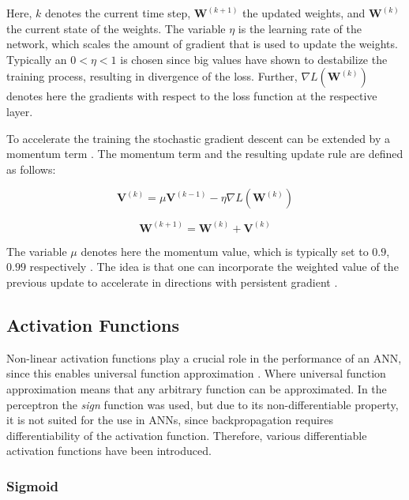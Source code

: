 Here, $k$ denotes the current time step, $\mathbf{W}^{(k+1)}$ the updated weights, and $\mathbf{W}^{(k)}$ the current state of the weights.
The variable $\eta$ is the learning rate of the network, which scales the amount of gradient that is used to update the weights.
Typically an $0 < \eta < 1$ is chosen since big values have shown to destabilize the training process, resulting in divergence of the loss.
Further, $\nabla L(\mathbf{W}^{(k)})$ denotes here the gradients with respect to the loss function at the respective layer.

To accelerate the training the stochastic gradient descent can be extended by a momentum term \cite{sgd_momentum}.
The momentum term and the resulting update rule are defined as follows:

\begin{equation}
    \mathbf{V}^{(k)} = \mu \mathbf{V}^{(k-1)} - \eta \nabla L(\mathbf{W}^{(k)})
\end{equation}

\begin{equation}
    \mathbf{W}^{(k+1)} = \mathbf{W}^{(k)} + \mathbf{V}^{(k)}
\end{equation}

The variable $\mu$ denotes here the momentum value, which is typically set to $0.9$, $0.99$ respectively \cite{adam}.
The idea is that one can incorporate the weighted value of the previous update to accelerate in directions with persistent gradient \cite{dl}.

\subsection{Activation Functions}
\label{sec:activation_functions}

Non-linear activation functions play a crucial role in the performance of an \ac{ANN}, since this enables universal function approximation \cite{mish}.
Where universal function approximation means that any arbitrary function can be approximated.
In the perceptron the \textit{sign} function was used, but due to its non-differentiable property, it is not suited for the use in \acp{ANN}, since backpropagation requires differentiability of the activation function.
Therefore, various differentiable activation functions have been introduced.

\subsubsection{Sigmoid}


